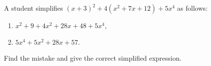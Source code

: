 A student simplifies $(x+3)^2+4(x^2+7x+12)+5x^4$ as follows:
\begin{enumerate}
\item $x^2+9+4x^2+28x+48+5x^4$,
\item $5x^4+5x^2+28x+57$.
\end{enumerate}
Find the mistake and give the correct simplified expression.
